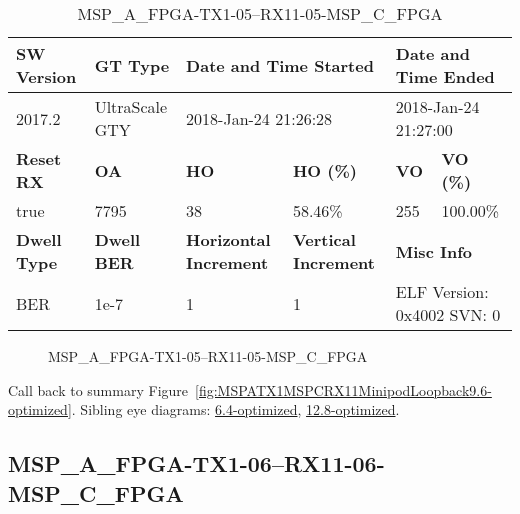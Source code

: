 \begin{table}[h]
\centering
\caption{MSP\_A\_FPGA-TX1-05--RX11-05-MSP\_C\_FPGA}
\label{tab:MSPAFPGATX105RX1105MSPCFPGA9.6-optimized}
\begin{tabular}{@{}|l|l|l|l|l|l|@{}}
\toprule
\textbf{SW Version}                & \textbf{GT Type}   & \multicolumn{2}{l|}{\textbf{Date and Time Started}}            & \multicolumn{2}{l|}{\textbf{Date and Time Ended}}        \\ \midrule
2017.2                       & UltraScale GTY          & \multicolumn{2}{l|}{2018-Jan-24 21:26:28}                   & \multicolumn{2}{l|}{2018-Jan-24 21:27:00}               \\ \midrule
\textbf{Reset RX}                  & \textbf{OA} & \textbf{HO}   & \textbf{HO (\%)} & \textbf{VO} & \textbf{VO (\%)} \\ \midrule
true & 7795        & 38          & 58.46\%        & 255        & 100.00\%       \\ \midrule
\textbf{Dwell Type}                & \textbf{Dwell BER} & \textbf{Horizontal Increment} & \textbf{Vertical Increment}    & \multicolumn{2}{l|}{\textbf{Misc Info}}                  \\ \midrule
BER                            & 1e-7        & 1        & 1           & \multicolumn{2}{l|}{ELF Version: 0x4002 SVN: 0}                         \\ \bottomrule
\end{tabular}
\end{table}

\begin{figure}[h]
\caption{MSP\_A\_FPGA-TX1-05--RX11-05-MSP\_C\_FPGA} \label{fig:MSPAFPGATX105RX1105MSPCFPGA9.6-optimized}
\end{figure}

Call back to summary Figure~\ref{fig:MSPATX1MSPCRX11MinipodLoopback9.6-optimized}.
Sibling eye diagrams: \hyperref[sec:MSPAFPGATX105RX1105MSPCFPGA6.4-optimized]{6.4-optimized}, \hyperref[sec:MSPAFPGATX105RX1105MSPCFPGA12.8-optimized]{12.8-optimized}.

\clearpage
\newpage


\subsection{MSP\_A\_FPGA-TX1-06--RX11-06-MSP\_C\_FPGA}\label{sec:MSPAFPGATX106RX1106MSPCFPGA9.6-optimized}

